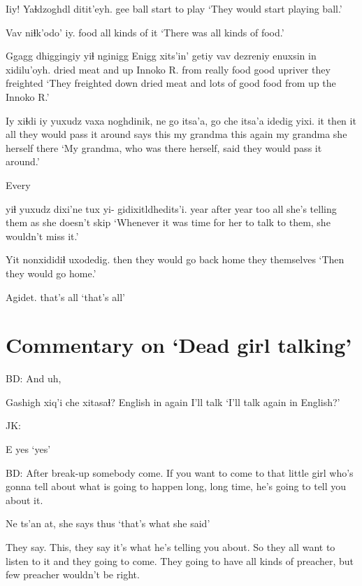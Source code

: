 \documentclass[12pt]{article}
\begin{document}
\gll Iiy! Yaɬdzoghdl ditit'eyh. 
gee   ball       {start to play}
\glt `They would start playing ball.'
\glend

\gll Vav  niɬk'odo'    iy.
food {all kinds of} it
\glt `There was all kinds of food.'
\glend

\gll Ggagg dhiggingiy yiɬ  nginigg Enigg xits'in' getiy   vav  dezreniy enuxsin {in xidilu'oyh.}
dried meat       and  up {Innoko R.} from     really food good      upriver {they freighted}
\glt `They freighted down dried meat and lots of good food from up the Innoko R.'
\glend
  
\gll Iy xiɬdi iy yuxudz  {vaxa noghdinik,}           ne   go   itsa'a,    go   che   itsa'a     idedig      yixi. 
it then it all  {they would pass it around} says this {my grandma} this again {my grandma} {she herself} there
\glt `My grandma, who was there herself, said they would pass it around.'
\glend

Every 

 yiɬ  yuxudz dixi'ne           tux yi- {gidixitldhedits'i}.
{year after year}         too all    {she's telling them} as {} {she doesn't skip}
\glt `Whenever it was time for her to talk to them, she wouldn't miss it.'
\glend

\gll Yit   nonxididiɬ              uxodedig.
then {they would go back home} {they themselves}
\glt `Then they would go home.'
\glend

\gll Agidet.
{{that's all}}
\glt `that's all'
\glend

\section*{Commentary on `Dead girl talking'}

BD:  And uh, 

\gll Gashigh xiq'i che  xitasaɬ?
English in    again {I'll talk}
\glt `I'll talk again in English?'
\glend

JK:  

\gll E
yes
\glt `yes'
\glend

BD:  After break-up somebody come.  If you want to come to that little
girl who's gonna tell about what is going to happen long, long time, he's
going to tell you about it. 

\gll Ne ts'an at, 
{she says} thus {}
\glt `that's what she said'
\glend

They say. This, they say it's what he's telling you about.  
So they all want to listen to it and they going to come.  
They going to have all kinds of preacher, but few preacher wouldn't be right.
\end{document}
